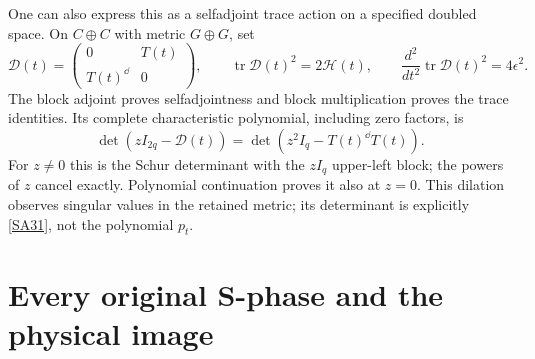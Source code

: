 \documentclass[11pt]{article}
\newcommand{\tr}{\operatorname{tr}}\newcommand{\Res}{\operatorname{Res}}
\begin{document}
One can also express this as a selfadjoint trace action
on a specified doubled space. On $C\oplus C$ with metric
$G\oplus G$, set
\begin{equation}\tag{SA30}\label{SA30}
\mathscr D(t)=
\begin{pmatrix}0&T(t)\\T(t)^{\dd}&0\end{pmatrix},
\qquad
\tr\mathscr D(t)^2=2\mathcal H(t),\qquad
\frac{d^2}{dt^2}\tr\mathscr D(t)^2=4\epsilon^2 .
\end{equation}
The block adjoint proves selfadjointness and block
multiplication proves the trace identities. Its complete
characteristic polynomial, including zero factors, is
\begin{equation}\tag{SA31}\label{SA31}
\det(zI_{2q}-\mathscr D(t))
=\det(z^2I_q-T(t)^{\dd}T(t)).
\end{equation}
For $z\ne0$ this is the Schur determinant with the
$zI_q$ upper-left block; the powers of $z$ cancel
exactly. Polynomial continuation proves it also at
$z=0$. This dilation observes singular values in the
retained metric; its determinant is explicitly
\eqref{SA31}, not the polynomial $p_t$.

\section{Every original S-phase and the physical image}
\end{document}
